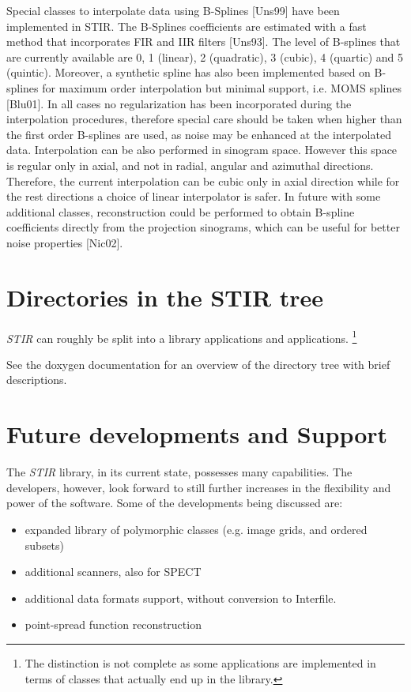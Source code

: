 \documentclass{article}
\begin{document}
{\label{sec:BSplines}
Special classes to interpolate data using B-Splines [Uns99] have been implemented in STIR. 
The B-Splines coefficients are estimated with a fast method that incorporates FIR and IIR 
filters [Uns93]. The level of B-splines that are currently available are 0, 1 (linear), 
2 (quadratic), 3 (cubic), 4 (quartic) and 5 (quintic). Moreover, a synthetic spline has also been 
implemented based on B-splines for maximum order interpolation but minimal support, i.e. MOMS 
splines [Blu01]. In all cases no regularization has been incorporated during the interpolation 
procedures, therefore special care should be taken when higher than the first order B-splines 
are used, as noise may be enhanced at the interpolated data. Interpolation can be also performed 
in sinogram space. However this space is regular only in axial, and not in radial, angular and 
azimuthal directions. Therefore, the current interpolation can be cubic only in axial direction 
while for the rest directions a choice of linear interpolator is safer. In future with some 
additional classes, reconstruction could be performed to obtain B-spline coefficients directly 
from the projection sinograms, which can be useful for better noise properties [Nic02].

\section{
Directories in the STIR tree}
\textit{STIR} can roughly be split into a library applications and applications.
\footnote{The distinction is not complete as some applications are implemented
in terms of classes that actually end up in the library.}

See the doxygen documentation for an overview of the directory tree with brief descriptions.

\section{
Future developments and Support}

The \textit{STIR} library, in its current state, possesses many capabilities. 
The developers, however, look forward to still further increases 
in the flexibility and power of the software. Some of the developments 
being discussed are:

\begin{itemize}
\item
expanded library of polymorphic classes (e.g. image grids, and 
ordered subsets)
\item
additional scanners, also for SPECT
\item
additional data formats support, without conversion to Interfile.
\item
point-spread function reconstruction
\end{itemize}


}
\end{document}
